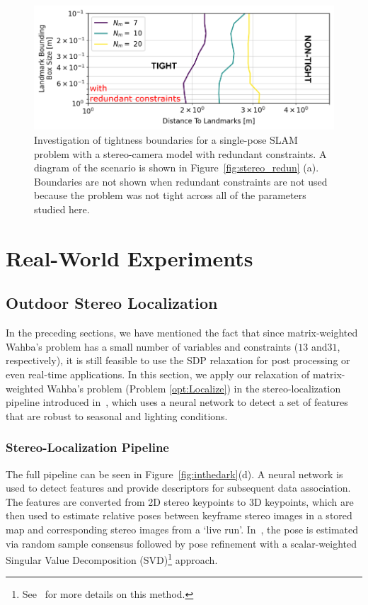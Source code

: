 \documentclass[lettersize,journal]{IEEEtran}
\begin{document}
\begin{figure}[!t]
	\centering
	\includegraphics[width=\columnwidth]{figs/slam_lms_redun}
	\caption{Investigation of tightness boundaries for a single-pose SLAM problem with a stereo-camera model with redundant constraints. A diagram of the scenario is shown in Figure~\ref{fig:stereo_redun} (a). Boundaries are not shown when redundant constraints are not used because the problem was not tight across all of the parameters studied here.}
	\label{fig:stereo_slam_redun}
\end{figure}


\section{Real-World Experiments}\label{sec:RealExp}
\subsection{Outdoor Stereo Localization}\label{sec:OutdoorLoc}

In the preceding sections, we have mentioned the fact that since matrix-weighted Wahba's problem has a small number of variables and constraints ($13$ and$31$, respectively), it is still feasible to use the SDP relaxation for post processing or even real-time applications. In this section, we apply our relaxation of matrix-weighted Wahba's problem (Problem \eqref{opt:Localize}) in the stereo-localization pipeline introduced in~\cite{gridsethKeepingEyeThings2022}, which uses a neural network to detect a set of features that are robust to seasonal and lighting conditions.

\subsubsection{Stereo-Localization Pipeline}

The full pipeline can be seen in Figure~\ref{fig:inthedark}(d). A neural network is used to detect features and provide descriptors for subsequent data association. The features are converted from 2D stereo keypoints to 3D keypoints, which are then used to estimate relative poses between keyframe stereo images in a stored map and corresponding stereo images from a `live run'. In~\cite{gridsethKeepingEyeThings2022}, the pose is estimated via random sample consensus followed by pose refinement with a scalar-weighted Singular Value Decomposition (SVD)\footnote{See~\cite{umeyamaLeastSquaresEstimationTransformation1991} for more details on this method.} approach. 
\end{document}
